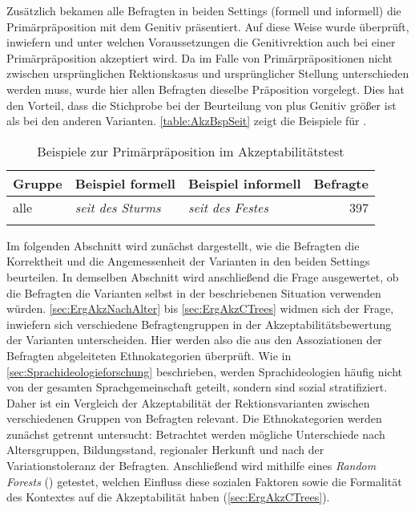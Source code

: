 Zusätzlich bekamen alle Befragten in beiden Settings (formell und informell) die Primärpräposition  mit dem Genitiv präsentiert.
Auf diese Weise wurde überprüft, inwiefern und unter welchen Voraussetzungen die Genitivrektion auch bei einer Primärpräposition akzeptiert wird. 
Da im Falle von Primärpräpositionen nicht zwischen ursprünglichen Rektionskasus und ursprünglicher Stellung unterschieden werden muss, wurde hier allen Befragten dieselbe Präposition vorgelegt. 
Dies hat den Vorteil, dass die Stichprobe bei der Beurteilung von  plus Genitiv größer ist als bei den anderen Varianten.
\autoref{table:AkzBspSeit} zeigt die Beispiele für . 

\begin{table}
\centering
\begin{tabular}{lllr}
\lsptoprule
{Gruppe} & Beispiel formell               & Beispiel informell       & Befragte \\ \midrule
alle               & \textit{ seit des Sturms} & \textit{ seit des Festes}         &          397         \\ 
\lspbottomrule
\end{tabular}
\caption{Beispiele zur Primärpräposition  im Akzeptabilitätstest}
\label{table:AkzBspSeit}
\end{table}

Im folgenden Abschnitt wird zunächst dargestellt, wie die Befragten die Korrektheit und die Angemessenheit der Varianten in den beiden Settings beurteilen. 
In demselben Abschnitt wird anschließend die Frage ausgewertet, ob die Befragten die Varianten selbst in der beschriebenen Situation verwenden würden. 
\autoref{sec:ErgAkzNachAlter} bis \autoref{sec:ErgAkzCTrees} widmen sich der Frage, inwiefern sich verschiedene Befragtengruppen in der Akzeptabilitätsbewertung der Varianten unterscheiden.
Hier werden also die aus den Assoziationen der Befragten abgeleiteten Ethnokategorien überprüft. 
Wie in \autoref{sec:Sprachideologieforschung} beschrieben, werden Sprachideologien häufig nicht von der gesamten Sprachgemeinschaft geteilt, sondern sind sozial stratifiziert.
Daher ist ein Vergleich der Akzeptabilität der Rektionsvarianten zwischen verschiedenen Gruppen von Befragten relevant. 
Die Ethnokategorien werden zunächst getrennt untersucht: 
Betrachtet werden mögliche Unterschiede nach Altersgruppen, Bildungsstand, regionaler Herkunft und nach der Variationstoleranz der Befragten. 
Anschließend wird mithilfe eines \textit{Random Forests} (\cites[s.][]{Breiman2001}[][297--299]{Levshina.2015}) getestet, welchen Einfluss diese sozialen Faktoren sowie die Formalität des Kontextes auf die Akzeptabilität haben (\autoref{sec:ErgAkzCTrees}). 

